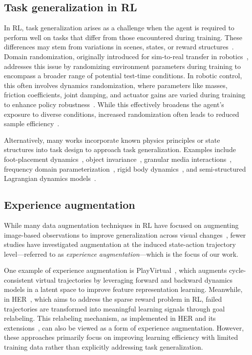 \subsection{Task generalization in RL}
In RL, task generalization arises as a challenge when the agent is required to perform well on tasks that differ from those encountered during training. 
These differences may stem from variations in scenes, states, or reward structures~\citep{zhou2022DGSurvey}.
Domain randomization, originally introduced for sim-to-real transfer in robotics~\citep{tobin2017DRforSim2Real, sadeghi2016cad2rl, peng2018DynRand}, addresses this issue by randomizing environment parameters during training to encompass a broader range of potential test-time conditions. 
In robotic control, this often involves dynamics randomization, where parameters like masses, friction coefficients, joint damping, and actuator gains are varied during training to enhance policy robustness~\citep{peng2018DynRand, lee2020LearnQuadrupedalLoco, kumar2021rma, miki2022perceptiveLoco, andrychowicz2020DexInHandManipulation}. 
While this effectively broadens the agent’s exposure to diverse conditions, increased randomization often leads to reduced sample efficiency~\citep{kirk2023surveyZSG}.

Alternatively, many works incorporate known physics principles or state structures into task design to approach task generalization.
Examples include foot-placement dynamics~\citep{yang2020data}, object invariance~\citep{sancaktar2022curious}, granular media interactions~\citep{choi2023learning}, frequency domain parameterization~\citep{li2024fld}, rigid body dynamics~\citep{song2024learning}, and semi-structured Lagrangian dynamics models~\citep{levy2024learning}.

\subsection{Experience augmentation}
While many data augmentation techniques in RL have focused on augmenting image-based observations to improve generalization across visual changes~\citep{laskin2020RLwithAugData, raileanu2021autoDataAug, hansen2021SoftDataAug, wang2020mixreg}, fewer studies have investigated augmentation at the induced state-action trajectory level---referred to as \textit{experience augmentation}---which is the focus of our work.

One example of experience augmentation is PlayVirtual~\citep{yu2021playvirtual}, which augments cycle-consistent virtual trajectories by leveraging forward and backward dynamics models in a latent space to improve feature representation learning.
Meanwhile, in HER~\citep{andrychowicz2017HER}, which aims to address the sparse reward problem in RL, failed trajectories are transformed into meaningful learning signals through goal relabeling. 
This relabeling mechanism, as implemented in HER and its extensions~\citep{fang2019curriculumHER, lin2020invariantTER, yang2021MHER, packer2021HERMetaRL}, can also be viewed as a form of experience augmentation.
However, these approaches primarily focus on improving learning efficiency with limited training data rather than explicitly addressing task generalization.

